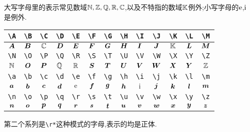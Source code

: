 \documentclass[lang=cn,12pt,scheme=chinese,mode=simple,black]{elegantbook}
\begin{document}
大写字母里的表示常见数域$\N,\Z,\Q,\R,\C$,以及不特指的数域$\K$例外;小写字母的$\e$,$\i$是例外.
\begin{center}
    \renewcommand{\arraystretch}{1.4}
    \begin{tabular}{|c|c|c|c|c|c|c|c|c|c|c|c|c|}
        \hline\hline
        \verb|\A| & \verb|\B| & \verb|\C| & \verb|\D| & \verb|\E| & \verb|\F| & \verb|\G| & \verb|\H| & \verb|\I| & \verb|\J| & \verb|\K| & \verb|\L| & \verb|\M| \\
        \hline
        $\A$      & $\B$      & $\C$      & $\D$      & $\E$      & $\F$      & $\G$      & $\H$      & $\I$      & $\J$      & $\K$      & $\L$      & $\M$      \\
        \hline\hline
        \verb|\N| & \verb|\O| & \verb|\P| & \verb|\Q| & \verb|\R| & \verb|\S| & \verb|\T| & \verb|\U| & \verb|\V| & \verb|\W| & \verb|\X| & \verb|\Y| & \verb|\Z| \\
        \hline
        $\N$      & $\O$      & $\P$      & $\Q$      & $\R$      & $\S$      & $\T$      & $\U$      & $\V$      & $\W$      & $\X$      & $\Y$      & $\Z$      \\
        \hline\hline
        \verb|\a| & \verb|\b| & \verb|\c| & \verb|\d| & \verb|\e| & \verb|\f| & \verb|\g| & \verb|\h| & \verb|\i| & \verb|\j| & \verb|\k| & \verb|\l| & \verb|\m| \\
        \hline
        $\a$      & $\b$      & $\c$      & $\d$      & $\e$      & $\f$      & $\g$      & $\h$      & $\i$      & $\j$      & $\k$      & $\l$      & $\m$      \\
        \hline\hline
        \verb|\n| & \verb|\o| & \verb|\p| & \verb|\q| & \verb|\r| & \verb|\s| & \verb|\t| & \verb|\u| & \verb|\v| & \verb|\w| & \verb|\x| & \verb|\y| & \verb|\z| \\
        \hline
        $\n$      & $\o$      & $\p$      & $\q$      & $\r$      & $\s$      & $\t$      & $\u$      & $\v$      & $\w$      & $\x$      & $\y$      & $\z$      \\
        \hline\hline
    \end{tabular}
\end{center}

\vspace{1cm}

第二个系列是\verb|\r*|这种模式的字母,表示的均是正体.
\end{document}
